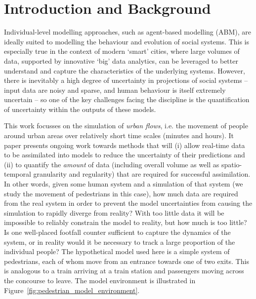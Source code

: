 \documentclass[runningheads]{llncs}
\begin{document}
\section{Introduction and Background}

Individual-level modelling approaches, such as agent-based modelling (ABM), are ideally suited to modelling the behaviour and evolution of social systems. This is especially true in the context of modern `smart' cities, where large volumes of data, supported by innovative `big' data analytics, can be leveraged to better understand and capture the characteristics of the underlying systems. However, there is inevitably a high degree of uncertainty in projections of social systems -- input data are noisy and sparse, and human behaviour is itself extremely uncertain -- so one of the key challenges facing the discipline is the quantification of uncertainty within the outputs of these models. 

This work focusses on the simulation of \textit{urban flows}, i.e. the movement of people around urban areas over relatively short time scales (minutes and hours). It paper presents ongoing work towards methods that will (i) allow real-time data to be assimilated into models to reduce the uncertainty of their predictions and (ii) to quantify the \textit{amount} of data (including overall volume as well as spatio-temporal granularity and regularity) that are required for successful assimilation. In other words, given some human system and a simulation of that system (we study the movement of pedestrians in this case), how much data are required from the real system in order to prevent the model uncertainties from causing the simulation to rapidly diverge from reality? With too little data it will be impossible to reliably constrain the model to reality, but how much is too little? Is one well-placed footfall counter sufficient to capture the dynamics of the system, or in reality would it be necessary to track a large proportion of the individual people? The hypothetical model used here is a simple system of pedestrians, each of whom move from an entrance towards one of two exits. This is analogous to a train arriving at a train station and passengers moving across the concourse to leave. The model environment is illustrated in Figure~\ref{fig:pedestrian_model_environment}. 
\end{document}
